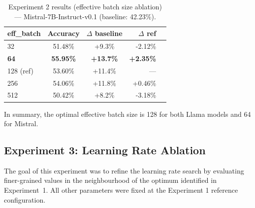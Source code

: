   \begin{table}[ht]
  \caption{Experiment 2 results (effective batch size ablation) --- Mistral-7B-Instruct-v0.1 (baseline: 42.23\%).}
  \centering
  \footnotesize
  \begin{tabular}{lccrr}
  \toprule
  \textbf{eff\_batch} & \textbf{Accuracy} & \textbf{$\Delta$ baseline} & \textbf{$\Delta$ ref} \\
  \midrule
  32  & 51.48\% & +9.3\%  & -2.12\% \\
  \textbf{64}  & \textbf{55.95\%} & \textbf{+13.7\%} & \textbf{+2.35\%} \\
  128 (ref) & 53.60\% & +11.4\% & --- \\
  256 & 54.06\% & +11.8\% & +0.46\% \\
  512 & 50.42\% & +8.2\%  & -3.18\% \\
  \bottomrule
  \end{tabular}

  \label{tab:exp2-mistral}
  \end{table}

  In summary, the optimal effective batch size is
  128 for both Llama models and 64 for
  Mistral.


\subsection{Experiment 3: Learning Rate Ablation}

  The goal of this experiment was to refine the learning rate search
  by evaluating finer-grained values in the neighbourhood of the
  optimum identified in Experiment~1. All other parameters
  were fixed at the Experiment 1 reference configuration.

